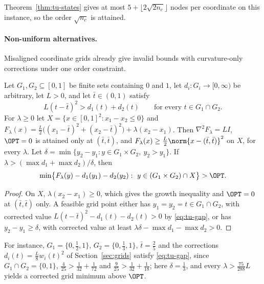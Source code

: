 Theorem~\ref{thm:tu-states} gives at most $5+\lfloor2\sqrt{2n_c}\rfloor$ nodes
per coordinate on this instance, so the order $\sqrt{n_c}$ is attained.

\paragraph{Non-uniform alternatives.} Misaligned coordinate grids already
give invalid bounds with curvature-only corrections under one order
constraint.

\begin{proposition}\label{prop:tu-misaligned}
Let $G_1,G_2\subseteq[0,1]$ be finite sets containing $0$ and $1$, let
$d_i:G_i\to[0,\infty)$ be arbitrary, let $L>0$, and let $\bar t\in(0,1)$
satisfy
\begin{equation}\label{eq:tu-gap}
L(t-\bar t)^2>d_1(t)+d_2(t)\qquad\text{for every }t\in G_1\cap G_2 .
\end{equation}
For $\lambda\ge0$ let $X=\{x\in[0,1]^2:x_1-x_2\le0\}$ and
$F_\lambda(x)=\frac L2\bigl((x_1-\bar t)^2+(x_2-\bar t)^2\bigr)+\lambda(x_2-x_1)$.
Then $\nabla^2F_\lambda=LI$, $\OPT=0$ is attained only at $(\bar t,\bar t)$,
and $F_\lambda(x)\ge\frac L2\norm{x-(\bar t,\bar t)}^2$ on $X$, for every
$\lambda$. Let $\delta=\min\{y_2-y_1:y\in G_1\times G_2,\ y_2>y_1\}$. If
$\lambda>(\max d_1+\max d_2)/\delta$, then
\[
\min\bigl\{F_\lambda(y)-d_1(y_1)-d_2(y_2):\ y\in(G_1\times G_2)\cap X\bigr\}>\OPT .
\]
\end{proposition}

\begin{proof}
On $X$, $\lambda(x_2-x_1)\ge0$, which gives the growth inequality and
$\OPT=0$ at $(\bar t,\bar t)$ only. A feasible grid point either has
$y_1=y_2=t\in G_1\cap G_2$, with corrected value
$L(t-\bar t)^2-d_1(t)-d_2(t)>0$ by \eqref{eq:tu-gap}, or has
$y_2-y_1\ge\delta$, with corrected value at least
$\lambda\delta-\max d_1-\max d_2>0$.
\end{proof}

For instance, $G_1=\{0,\frac12,1\}$, $G_2=\{0,\frac13,1\}$, $\bar t=\frac25$
and the corrections $d_i(t)=\frac L8w_i(t)^2$ of Section~\ref{sec:grids}
satisfy \eqref{eq:tu-gap}, since $G_1\cap G_2=\{0,1\}$,
$\frac4{25}>\frac1{32}+\frac1{72}$ and $\frac9{25}>\frac1{32}+\frac1{18}$; here
$\delta=\frac13$, and every $\lambda>\frac{75}{288}L$ yields a corrected grid
minimum above $\OPT$.

